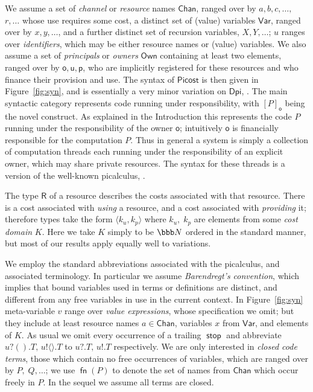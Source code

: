 \documentclass{LMCS}
\newcommand{\pfn}[1]{\mathsf{#1}}  \newcommand{\cfn}[1]{\mathsf{#1}}  \newcommand{\ownfnt}[1]{{\mathsf{#1}}}
\newcommand{\DPI}{\ensuremath{\pfn{Dpi}}\xspace}
\newcommand{\picost}{\ensuremath{\pfn{Picost}}\xspace}
\newcommand{\Own}{\ensuremath{\pfn{Own}}\xspace}
\newcommand{\Chan}{\ensuremath{\pfn{Chan}}\xspace}
\newcommand{\Var}{\ensuremath{\mathsf{Var}}\xspace}
\newcommand{\Kost}{\ensuremath{K}\xspace}
\newcommand{\nats}{\ensuremath{\bbb N}\xspace}
\def\pair(#1,#2){\langle #1 , #2 \rangle}\newcommand{\parrow}{ \mathbin{\rightharpoonup}}
\newcommand{\typeletter}[1]{{\mathsf{#1}}}
\newcommand{\tR}{\typeletter{R}}
\newcommand{\pa}[1]{\!\left(#1\right)}
\newcommand{\pc}[1]{\langle#1\rangle}
\newcommand{\Cstop}{\mathop{\pfn{stop}}}
\newcommand{\Cloc}[2]{[#1]_{\ownfnt{#2}}}
\newcommand{\fn}[1]{\mathop{\pfn{fn}}(#1)}
\begin{document}
We assume a set of \emph{channel} or \emph{resource} names \Chan,
ranged over by $a,b,c,\ldots,$ $r,\ldots $ whose use requires some cost,
a distinct set of (value) variables $\Var$, ranged over by
$x,y,\ldots$, and a further distinct set of recursion variables,
$X,Y,\ldots$; $u$ ranges over \emph{identifiers}, which may be either
resource names or (value) variables.  We also assume a set of
\emph{principals} or \emph{owners} \Own containing at least two
elements, ranged over by $\ownfnt o, \ownfnt u, \ownfnt p$, who are
implicitly registered for these resources and who finance their
provision and use. The syntax of \picost is then given in
Figure~\ref{fig:syn}, and is essentially a very minor variation on
\DPI, \cite{dpibook}. The main syntactic category represents code
running under responsibility, with $\Cloc{P}{o}$ being the novel
construct. As explained in the Introduction this represents the code
$P$ running under the responsibility of the owner $\ownfnt o$;
intuitively $\ownfnt o$ is financially responsible for the computation
$P$. Thus in general a system is simply a collection of computation
threads each running under the responsibility of an explicit owner,
which may share private resources. The syntax for these threads is a
version of the well-known picalculus, \cite{pibook}.

The type $\tR$ of a  resource  describes the costs 
associated with that resource. There is a cost associated with \emph{using}
a resource, and a cost associated with \emph{providing} it; therefore
types take the form
\begin{math}
  \pair(k_u,k_p)
\end{math}
where $k_u,\;k_p$ are elements from some \emph{cost domain} \Kost.
Here we take \Kost simply to be $\nats$ ordered in the standard manner, 
but most of our results apply equally well to variations. 



We employ the standard abbreviations associated with the picalculus,
and associated terminology. In particular we assume \emph{Barendregt's
  convention}\label{barendregt}, which implies that bound variables used in terms or
definitions are distinct, and different from any free variables in use
in the current context.  In Figure~\ref{fig:syn} meta-variable $v$
range over \emph{value expressions}, whose specification we omit; but
they include at least resource names $a \in \Chan$, variables $x$ from
$\Var$, and elements of $\Kost$. As usual we omit every
occurrence of a trailing $\Cstop$ and abbreviate $u?\pa{}.T,\,
u!\pc{}.T$ to $u?.T,\, u!.T$ respectively.  We are only interested in
\emph{closed code terms}, those which contain no free occurrences of
variables, which are ranged over by $P,\;Q,\ldots$; we use   
$\fn{P}$ to denote the set of names from  $\Chan$ which occur freely in $P$. 
 In the
sequel we assume all terms are closed.
\end{document}
